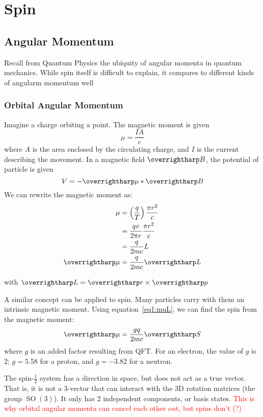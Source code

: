 \chapter{Spin}
\section{Angular Momentum}
Recall from Quantum Physics the ubiquity of angular momenta in quantum mechanics. While spin itself is difficult to explain, it compares to different kinds of angularm momentum well
\subsection{Orbital Angular Momentum}
Imagine a charge orbiting a point. The magnetic moment is given 
\[\mu=\frac{IA}{c}\]
where \(A\) is the area enclosed by the circulating charge, and \(I\) is the current describing the movement. In a magnetic field \(\vv{B}\), the potential of particle is given
\[V=-\vv{\mu}*\vv{B}\]
We can rewrite the magnetic moment as:
\begin{align}
	\mu&= \left(\frac{q}{T}\right)\frac{\pi r^2}{c}\nonumber\\
	   &= \frac{qv}{2\pi r}\frac{\pi r^2}{c}\nonumber\\
	   &=\frac{q}{2mc}L\nonumber\\
	\vv{\mu}&=\frac{q}{2mc}\vv{L}\label{eq1:muL}
\end{align}

with \(\vv{L}=\vv{r}\times\vv{p}\)

A similar concept can be applied to spin. Many particles carry with them an intrinsic magnetic moment. Using equation~\ref{eq1:muL}, we can find the spin from the magnetic moment:
\begin{equation}
	\vv{\mu}=\frac{gq}{2mc}\vv{S}\label{eq1:muS}
\end{equation}
where \(g\) is an added factor resulting from QFT\@.
For an electron, the value of \(g\) is 2; \(g=5.58\) for a proton, and \(g=-3.82\) for a neutron. 

\begin{aside}
The spin-\(\frac{1}{2}\) system has a direction in space, but does not act as a true vector.
That is, it is not a 3-vector that can interact with the 3D rotation matrices (the group \(\operatorname{SO}(3)\)).
It only has 2 independent components, or basis states.
\textcolor{red}{This is why orbital angular momenta can cancel each other out, but spins don't (?)}
\end{aside}

